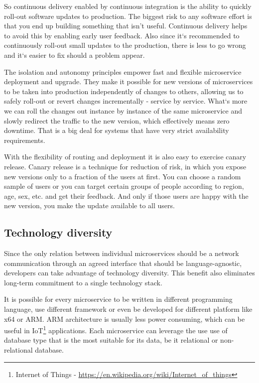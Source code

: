 \documentclass[12pt,oneside]{fithesis2}
\begin{document}
So continuous delivery enabled by continuous integration is the ability to quickly roll-out software updates to production. The biggest risk to any software effort is that you end up building something that isn't useful. Continuous delivery helps to avoid this by enabling early user feedback. Also since it`s recommended to continuously roll-out small updates to the production, there is less to go wrong and it`s easier to fix should a problem appear.

The isolation and autonomy principles empower fast and flexible microservice deployment and upgrade. They make it possible for new versions of microservices to be taken into production independently of changes to others, allowing us to safely roll-out or revert changes incrementally - service by service. What`s more we can roll the changes out instance by instance of the same microservice and slowly redirect the traffic to the new version, which effectively means zero downtime. That is a big deal for systems that have very strict availability requirements.

With the flexibility of routing and deployment it is also easy to exercise canary release. Canary release is a technique for reduction of risk, in which you expose new versions only to a fraction of the users at first. You can choose a random sample of users or you can target certain groups of people according to region, age, sex, etc. and get their feedback. And only if those users are happy with the new version, you make the update available to all users.

\subsection{Technology diversity}

Since the only relation between individual microservices should be a network communication through an agreed interface that should be language-agnostic, developers can take advantage of technology diversity. This benefit also eliminates long-term commitment to a single technology stack.

It is possible for every microservice to be written in different programming language, use different framework or even be developed for different platform like x64 or ARM. ARM architecture is usually less power consuming, which can be useful in IoT\footnote{Internet of Things - \url{https://en.wikipedia.org/wiki/Internet_of_things}} applications. Each microservice can leverage the use use of database type that is the most suitable for its data, be it relational or non-relational database.
\end{document}
